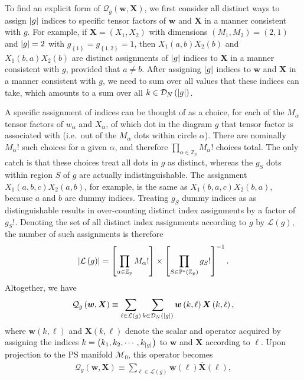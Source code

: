 \documentclass[nofootinbib,notitlepage,11pt]{revtex4-2}
\newcommand{\p}[1]{\left(#1\right)} %
\renewcommand{\sp}[1]{\left[#1\right]} %
\renewcommand{\set}[1]{\left\{#1\right\}} %
\newcommand{\m}{\bm} %
\newcommand{\1}{\mathds{1}}
\newcommand{\D}{\mathcal{D}}
\renewcommand{\L}{\mathcal{L}}
\newcommand{\M}{\mathcal{M}}
\newcommand{\Q}{\mathcal{Q}}
\newcommand{\PP}{\mathbb{P}}
\newcommand{\ZZ}{\mathbb{Z}}
\newcommand{\col}{\underline}
\newcommand{\mean}{\overline}
\begin{document}
To find an explicit form of $\Q_g\p{\m w,\m X}$, we first consider all distinct ways to assign $\abs{g}$ indices to specific tensor factors of $\m w$ and $\m X$ in a manner consistent with $g$.
For example, if $\m X=\p{X_1,X_2}$ with dimensions $\p{M_1,M_2}=\p{2,1}$ and $\abs{g}=2$ with $g_{\set{1}}=g_{\set{1,2}}=1$, then $X_1\p{a,b} X_2\p{b}$ and $X_1\p{b,a} X_2\p{b}$ are distinct assignments of $\abs{g}$ indices to $\m X$ in a manner consistent with $g$, provided that $a\ne b$.
After assigning $\abs{g}$ indices to $\m w$ and $\m X$ in a manner consistent with $g$, we need to sum over all values that these indices can take, which amounts to a sum over all $k\in\D_N\p{\abs{g}}$.

A specific assignment of indices can be thought of as a choice, for each of the $M_\alpha$ tensor factors of $w_\alpha$ and $X_\alpha$, of which dot in the diagram $g$ that tensor factor is associated with (i.e.~out of the $M_\alpha$ dots within circle $\alpha$).
There are nominally $M_\alpha!$ such choices for a given $\alpha$, and therefore $\prod_{\alpha\in\ZZ_p}M_\alpha!$ choices total.
The only catch is that these choices treat all dots in $g$ as distinct, whereas the $g_S$ dots within region $S$ of $g$ are actually indistinguishable.
The assignment $X_1\p{a,b,c} X_2\p{a,b}$, for example, is the same as $X_1\p{b,a,c} X_2\p{b,a}$, because $a$ and $b$ are dummy indices.
Treating $g_S$ dummy indices as as distinguishable results in over-counting distinct index assignments by a factor of $g_S!$.
Denoting the set of all distinct index assignments according to $g$ by $\L\p{g}$, the number of such assignments is therefore
\begin{align}
  \abs{\L\p{g}} = \sp{\prod_{\alpha\in\ZZ_p}M_\alpha!}
  \times \sp{\prod_{S\in\PP^*\p{\ZZ_p}} g_S!}^{-1}.
  \label{eq:symmetry}
\end{align}
Altogether, we have
\begin{align}
  \Q_g\p{\m w,\m X} \equiv
  \sum_{\ell\in\L\p{g}} \sum_{k\in\D_N\p{\abs{g}}}
  \m w\p{k,\ell} \m X\p{k,\ell},
\end{align}
where $\m w\p{k,\ell}$ and $\m X\p{k,\ell}$ denote the scalar and operator acquired by assigning the indices $k=\p{k_1,k_2,\cdots,k_{\abs{g}}}$ to $\m w$ and $\m X$ according to $\ell$.
Upon projection to the PS manifold $\M_0$, this operator becomes
\begin{align}
  \Q_g\p{\m w,\m X} \equiv
  \sum_{\ell\in\L\p{g}} \col{\m w}\p{\ell} \mean{\m X}\p{\ell},
  \label{eq:sum_assignments}
\end{align}
\end{document}
